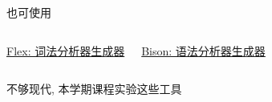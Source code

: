 



\begin{frame}{}
  \begin{center}
    也可使用
  \end{center}
\end{frame}

\begin{frame}{}
  \begin{columns}
    \begin{center}
      \href{https://en.wikipedia.org/wiki/Flex_(lexical_analyser_generator)}{\footnotesize Flex: 词法分析器生成器}
    \end{center}
    \begin{center}
      \href{https://en.wikipedia.org/wiki/GNU_Bison}{\footnotesize Bison: 语法分析器生成器}
    \end{center}
  \end{columns}

  \vspace{0.50cm}
  \begin{center}
    不够现代, 本学期课程实验这些工具
  \end{center}
\end{frame}

